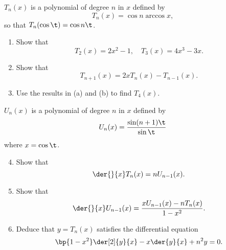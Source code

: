 \begin{problem}
    $T_n(x)$ is a polynomial of degree $n$ in $x$ defined by \[T_n(x) = \cos{n \arccos x},\] so that $T_n(\cos \t) = \cos{n \t}$.

    \begin{enumerate}
        \item Show that \[T_2(x) = 2x^2 - 1, \quad T_3(x) = 4x^3 - 3x.\]
        \item Show that \[T_{n+1} (x) = 2x T_n (x) - T_{n-1} (x).\]
        \item Use the results in (a) and (b) to find $T_4(x)$.
    \end{enumerate}

    $U_n(x)$ is a polynomial of degree $n$ in $x$ defined by \[U_n(x) = \frac{\sin (n+1)\t}{\sin \t}\] where $x = \cos \t$.

    \begin{enumerate}
        \setcounter{enumi}{3}
        \item Show that \[\der{}{x} T_n(x) = nU_{n-1}(x).\]
        \item Show that \[\der{}{x} U_{n-1}(x) = \frac{xU_{n-1}(x) - n T_n(x)}{1 - x^2}.\]
        \item Deduce that $y = T_n(x)$ satisfies the differential equation \[\bp{1 - x^2} \der[2]{y}{x} - x\der{y}{x} + n^2 y = 0.\]
    \end{enumerate}
\end{problem}
